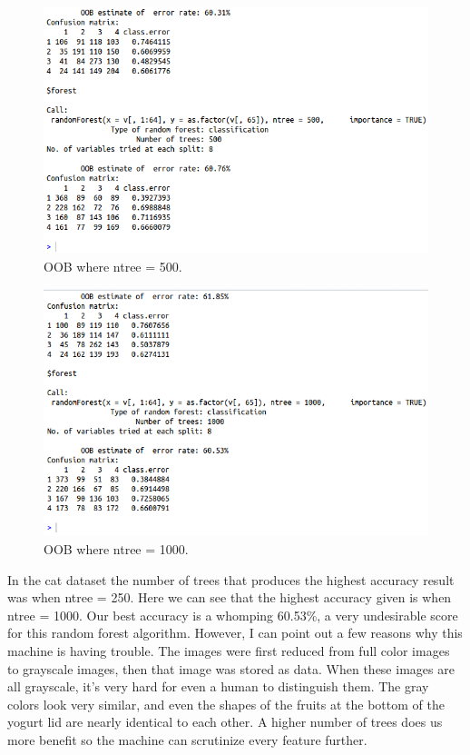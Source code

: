 \documentclass[12pt, letterpaper]{article}
\begin{document}
\begin{figure}[H]
\centering
\includegraphics[width=5.0in]{yogurtOOB500}
\caption{OOB where ntree = 500.}
\label{fig:oob2}
\end{figure}

\begin{figure}[H]
\centering
\includegraphics[width=5.0in]{yogurtOOB1000}
\caption{OOB where ntree = 1000.}
\label{fig:oob3}
\end{figure}

In the cat dataset the number of trees that produces the highest accuracy result was when ntree = 250. Here we can see that the highest accuracy given is when ntree = 1000. Our best accuracy is a whomping 60.53\%, a very undesirable score for this random forest algorithm. However, I can point out a few reasons why this machine is having trouble. The images were first reduced from full color images to grayscale images, then that image was stored as data. When these images are all grayscale, it's very hard for even a human to distinguish them. The gray colors look very similar, and even the shapes of the fruits at the bottom of the yogurt lid are nearly identical to each other. A higher number of trees does us more benefit so the machine can scrutinize every feature further.
\end{document}

